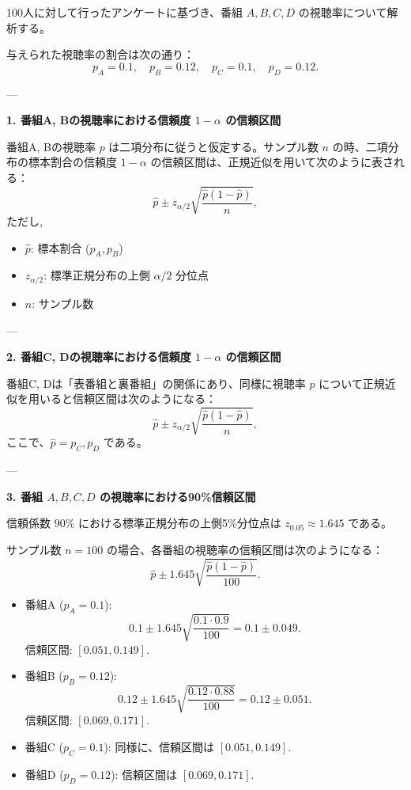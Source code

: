 \documentclass[10pt]{jsarticle}
\begin{document}
100人に対して行ったアンケートに基づき、番組 \(A, B, C, D\) の視聴率について解析する。

与えられた視聴率の割合は次の通り：
\[
p_A = 0.1, \quad p_B = 0.12, \quad p_C = 0.1, \quad p_D = 0.12.
\]

---

{\bf 1. 番組A, Bの視聴率における信頼度 \(1 - \alpha\) の信頼区間}

番組A, Bの視聴率 \(p\) は二項分布に従うと仮定する。サンプル数 \(n\) の時、二項分布の標本割合の信頼度 \(1 - \alpha\) の信頼区間は、正規近似を用いて次のように表される：
\[
\hat{p} \pm z_{\alpha/2} \sqrt{\frac{\hat{p} (1 - \hat{p})}{n}},
\]
ただし, 
\begin{itemize}
    \item \(\hat{p}\): 標本割合 (\(p_A, p_B\))
    \item \(z_{\alpha/2}\): 標準正規分布の上側 \(\alpha/2\) 分位点
    \item \(n\): サンプル数
\end{itemize}

---

{\bf 2. 番組C, Dの視聴率における信頼度 \(1 - \alpha\) の信頼区間}

番組C, Dは「表番組と裏番組」の関係にあり、同様に視聴率 \(p\) について正規近似を用いると信頼区間は次のようになる：
\[
\hat{p} \pm z_{\alpha/2} \sqrt{\frac{\hat{p} (1 - \hat{p})}{n}},
\]
ここで、\(\hat{p} = p_C, p_D\) である。

---

{\bf 3. 番組 \(A, B, C, D\) の視聴率における90\%信頼区間}

信頼係数 \(90\%\) における標準正規分布の上側5\%分位点は \(z_{0.05} \approx 1.645\) である。

サンプル数 \(n = 100\) の場合、各番組の視聴率の信頼区間は次のようになる：
\[
\hat{p} \pm 1.645 \sqrt{\frac{\hat{p} (1 - \hat{p})}{100}}.
\]

\begin{itemize}
    \item 番組A (\(p_A = 0.1\)):
    \[
    0.1 \pm 1.645 \sqrt{\frac{0.1 \cdot 0.9}{100}} = 0.1 \pm 0.049.
    \]
    信頼区間: \([0.051, 0.149]\).

    \item 番組B (\(p_B = 0.12\)):
    \[
    0.12 \pm 1.645 \sqrt{\frac{0.12 \cdot 0.88}{100}} = 0.12 \pm 0.051.
    \]
    信頼区間: \([0.069, 0.171]\).

    \item 番組C (\(p_C = 0.1\)):
    同様に、信頼区間は \([0.051, 0.149]\).

    \item 番組D (\(p_D = 0.12\)):
    信頼区間は \([0.069, 0.171]\).
\end{itemize}
\end{document}
